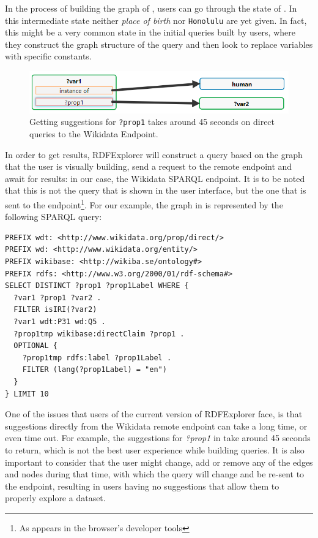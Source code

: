In the process of building the graph of , users can go through the state of . 
In this intermediate state neither \textit{place of birth} nor \texttt{Honolulu} are yet given. 
In fact, this might be a very common state in the initial queries built by users, where they construct the graph structure of the query and then look to replace variables with specific constants. 

\begin{figure}[h]
    \centering
        \includegraphics[width=0.8\linewidth]{imagenes/near timeout query.png}
        \caption{Getting suggestions for \texttt{?prop1} takes around 45 seconds on direct queries to the Wikidata Endpoint.}
        \label{fig:rdfExplorer_nearTimeout}
\end{figure}

In order to get results, RDFExplorer will construct a query based on the graph that the user is visually building, send a request to the remote endpoint and await for results: in our case, the Wikidata SPARQL endpoint. 
It is to be noted that this is not the query that is shown in the user interface, but the one that is sent to the endpoint\footnote{As appears in the browser's developer tools}. 
For our example, the graph in  is represented by the following SPARQL query:

\begin{verbatim}
PREFIX wdt: <http://www.wikidata.org/prop/direct/>
PREFIX wd: <http://www.wikidata.org/entity/>
PREFIX wikibase: <http://wikiba.se/ontology#>
PREFIX rdfs: <http://www.w3.org/2000/01/rdf-schema#>
SELECT DISTINCT ?prop1 ?prop1Label WHERE {
  ?var1 ?prop1 ?var2 .
  FILTER isIRI(?var2)
  ?var1 wdt:P31 wd:Q5 .
  ?prop1tmp wikibase:directClaim ?prop1 .
  OPTIONAL {
    ?prop1tmp rdfs:label ?prop1Label .
    FILTER (lang(?prop1Label) = "en")
  }
} LIMIT 10
\end{verbatim}

One of the issues that users of the current version of RDFExplorer face, is that suggestions directly from the Wikidata remote endpoint can take a long time, or even time out. For example, the suggestions for \textit{?prop1} in  take around 45 seconds to return, which is not the best user experience while building queries. It is also important to consider that the user might change, add or remove any of the edges and nodes during that time, with which the query will change and be re-sent to the endpoint, resulting in users having no suggestions that allow them to properly explore a dataset. 

